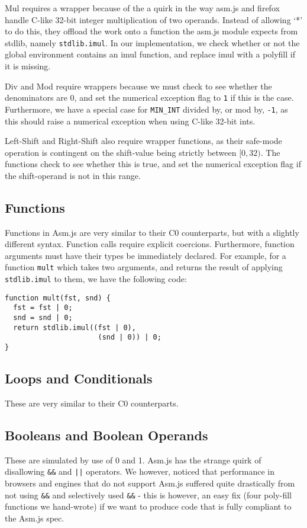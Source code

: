 \documentclass[twoside]{article}
\begin{document}
\begin{multicols}{2}
    Mul requires a 
    wrapper because of the a quirk in the way asm.js and firefox handle C-like 32-bit integer 
    multiplication of two operands. Instead of allowing `*' to do this, they offload the work
    onto a function the asm.js module expects from stdlib, namely \texttt{stdlib.imul}. In 
    our implementation, we check whether or not the global environment contains an imul function,
    and replace imul with a polyfill if it is missing. 

    Div and Mod require wrappers because we must check to see whether the denominators are 0,
    and set the numerical exception flag to \texttt{1} if this is the case. Furthermore, we have
    a special case for \texttt{MIN\_INT} divided by, or mod by, \texttt{-1}, as this should raise
    a numerical exception when using C-like 32-bit ints. 

    Left-Shift and Right-Shift also require wrapper functions, as their safe-mode operation
    is contingent on the shift-value being strictly between $[0,32)$. The functions check
    to see whether this is true, and set the numerical exception flag if the shift-operand is
    not in this range. 
  \subsection{Functions}
    Functions in Asm.js are very similar to their C0 counterparts, but with a
    slightly different syntax. Function calls require explicit coercions. Furthermore,
    function arguments must have their types be immediately declared. For example, for
    a function \texttt{mult} which takes two arguments, and returns the result of applying
    \texttt{stdlib.imul} to them, we have the following code: 
\begin{verbatim}
function mult(fst, snd) {
  fst = fst | 0;
  snd = snd | 0;
  return stdlib.imul((fst | 0), 
                      (snd | 0)) | 0;
}
\end{verbatim}

  \subsection{Loops and Conditionals}
    These are very similar to their C0 counterparts.

  \subsection{Booleans and Boolean Operands}
    These are simulated by use of 0 and 1. Asm.js has the strange quirk of disallowing 
    \texttt{\&\&} and \texttt{||} operators. We however, noticed that performance in browsers
    and engines that do not support Asm.js suffered quite drastically from not using \texttt{\&\&}
    and selectively used \texttt{\&\&} - this is however, an easy fix (four poly-fill functions we
    hand-wrote) if we want to produce code that is fully compliant to the Asm.js spec. 


\end{multicols}
\end{document}
